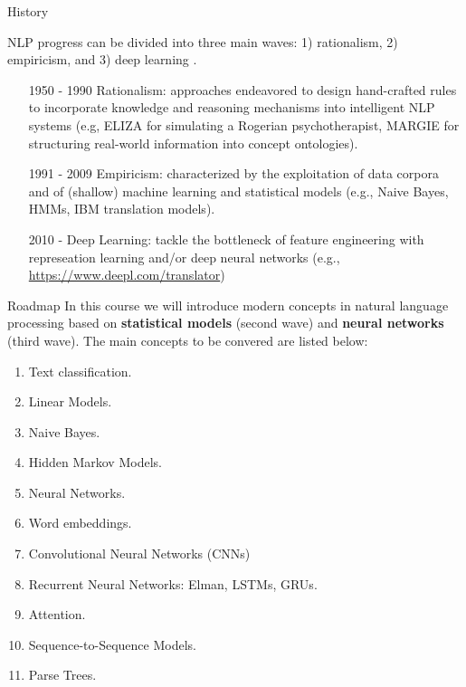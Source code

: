 \documentclass[handout]{beamer}
\begin{document}
\begin{frame}{History}
\begin{scriptsize}
NLP progress can be divided into three main waves: 1) rationalism, 2) empiricism, and 3) deep learning \cite{deng2018deep}.
\begin{itemize}
\item [1950 - 1990] Rationalism: approaches endeavored to design hand-crafted rules to incorporate knowledge and reasoning mechanisms into intelligent NLP systems (e.g,  ELIZA for simulating a Rogerian psychotherapist, MARGIE for structuring real-world information into concept ontologies).
\item [1991 - 2009] Empiricism: characterized by the exploitation of data corpora and
of (shallow) machine learning and statistical models (e.g., Naive Bayes, HMMs, IBM translation models).
\item [2010 - ] Deep Learning: tackle the bottleneck of feature engineering with represeation learning and/or deep neural networks (e.g., \url{https://www.deepl.com/translator})
\end{itemize}

\end{scriptsize}
\end{frame}



\begin{frame}{Roadmap}
In this course we will introduce modern concepts in natural language processing based on \textbf{statistical models} (second wave) and \textbf{neural networks} (third wave). The main concepts to be convered are listed below:
\begin{scriptsize}
\begin{enumerate}
\item Text classification.
\item Linear Models.
\item Naive Bayes.
\item Hidden Markov Models.
\item Neural Networks.
\item Word embeddings.
\item Convolutional Neural Networks (CNNs) 
\item Recurrent Neural Networks: Elman, LSTMs, GRUs. 
\item Attention.
\item Sequence-to-Sequence Models.
\item Parse Trees.
\end{enumerate} 
\end{scriptsize}
\end{frame}
\end{document}

